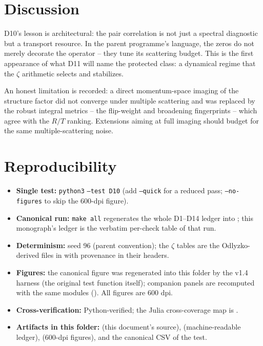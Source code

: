 \documentclass[11pt,a4paper]{article}
\begin{document}
\section{Discussion}
D10's lesson is architectural: the pair correlation is not just a spectral diagnostic but a transport resource. In the parent programme's language, the zeros do not merely decorate the operator -- they tune its scattering budget. This is the first appearance of what D11 will name the protected class: a dynamical regime that the $\zeta$ arithmetic selects and stabilizes.

An honest limitation is recorded: a direct momentum-space imaging of the structure factor did not converge under multiple scattering and was replaced by the robust integral metrics -- the flip-weight and broadening fingerprints -- which agree with the $R/T$ ranking. Extensions aiming at full imaging should budget for the same multiple-scattering noise.

\section{Reproducibility}
\begin{itemize}[leftmargin=1.2em, itemsep=0.15em]
\item \textbf{Single test:} \texttt{python3}  \texttt{--test D10} (add \texttt{--quick} for a reduced pass; \texttt{--no-figures} to skip the 600-dpi figure).
\item \textbf{Canonical run:} \texttt{make all} regenerates the whole D1--D14 ledger into ; this monograph's ledger is the verbatim per-check table of that run.
\item \textbf{Determinism:} seed 96 (parent convention); the $\zeta$ tables are the Odlyzko-derived files in  with provenance in their headers.
\item \textbf{Figures:} the canonical figure was regenerated into this folder by the v1.4 harness (the original test function itself); companion panels are recomputed with the same modules (). All figures are 600 dpi.
\item \textbf{Cross-verification:} Python-verified; the Julia cross-coverage map is .
\item \textbf{Artifacts in this folder:}  (this document's source),  (machine-readable ledger),  (600-dpi figures), and the canonical CSV of the test.
\end{itemize}
\end{document}
